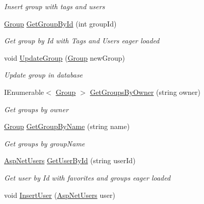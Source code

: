\begin{DoxyCompactItemize}
\begin{DoxyCompactList}\small\item\em Insert group with tags and users \end{DoxyCompactList}\item 
\hyperlink{class_website_1_1_models_1_1_group}{Group} \hyperlink{class_website_1_1_models_1_1_d_a_l_e_f_ab405892af8531bc9b395941e7edad54e}{Get\+Group\+By\+Id} (int group\+Id)
\begin{DoxyCompactList}\small\item\em Get group by Id with Tags and Users eager loaded \end{DoxyCompactList}\item 
void \hyperlink{class_website_1_1_models_1_1_d_a_l_e_f_a0fdec784d86619ca4a0d190eaf2c1766}{Update\+Group} (\hyperlink{class_website_1_1_models_1_1_group}{Group} new\+Group)
\begin{DoxyCompactList}\small\item\em Update group in database \end{DoxyCompactList}\item 
I\+Enumerable$<$ \hyperlink{class_website_1_1_models_1_1_group}{Group} $>$ \hyperlink{class_website_1_1_models_1_1_d_a_l_e_f_ae3ad1a3129150ded40c6dd714c90712d}{Get\+Groups\+By\+Owner} (string owner)
\begin{DoxyCompactList}\small\item\em Get groups by owner \end{DoxyCompactList}\item 
\hyperlink{class_website_1_1_models_1_1_group}{Group} \hyperlink{class_website_1_1_models_1_1_d_a_l_e_f_ae82f2098fd76de55b15dfb3b65b45159}{Get\+Group\+By\+Name} (string name)
\begin{DoxyCompactList}\small\item\em Get groups by group\+Name \end{DoxyCompactList}\item 
\hyperlink{class_website_1_1_asp_net_users}{Asp\+Net\+Users} \hyperlink{class_website_1_1_models_1_1_d_a_l_e_f_ad8b5298260d68e22bb3a3bc1b4bfa386}{Get\+User\+By\+Id} (string user\+Id)
\begin{DoxyCompactList}\small\item\em Get user by Id with favorites and groups eager loaded \end{DoxyCompactList}\item 
void \hyperlink{class_website_1_1_models_1_1_d_a_l_e_f_a2a921d9fa7b37fe65d2c465e54f0b9da}{Insert\+User} (\hyperlink{class_website_1_1_asp_net_users}{Asp\+Net\+Users} user)

\end{DoxyCompactItemize}
